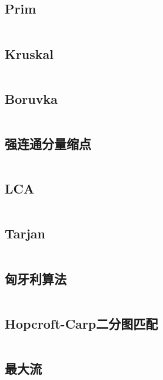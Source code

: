 \documentclass[a4paper]{article}
\newcommand{\cppcode}[1]{
    \inputminted[mathescape]{cpp}{#1}
}
\begin{document}
\cppcode{graph/Floyd-Warshall.cpp}

\subsection{Prim}

\cppcode{graph/Prim.cpp}

\subsection{Kruskal}

\cppcode{graph/Kruskal.cpp}

\subsection{Boruvka}

\cppcode{graph/Boruvka.cpp}

\subsection{强连通分量缩点}

\cppcode{graph/scc.cpp}

\subsection{LCA}

\cppcode{graph/LCA.cpp}

\subsection{Tarjan}

\cppcode{graph/Tarjan.cpp}

\subsection{匈牙利算法}

\cppcode{graph/bipartite-matching.cpp}

\subsection{Hopcroft-Carp二分图匹配}

\cppcode{graph/Hopcroft-Carp.cpp}

\subsection{最大流}
\end{document}
